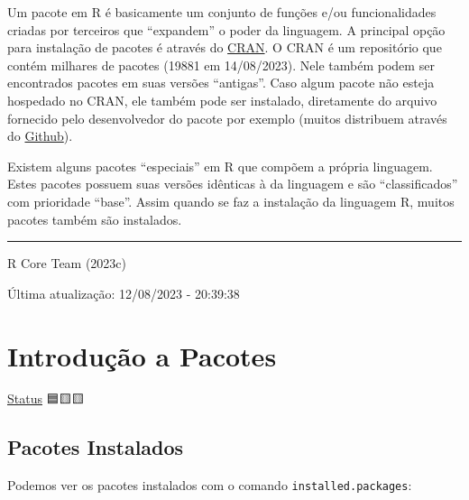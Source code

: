 \documentclass[
  letterpaper,
  DIV=11,
  numbers=noendperiod]{scrreprt}
\newenvironment{Shaded}{\begin{snugshade}}{\end{snugshade}}
\newcommand{\CommentTok}[1]{\textcolor[rgb]{0.37,0.37,0.37}{#1}}
\newcommand{\DecValTok}[1]{\textcolor[rgb]{0.68,0.00,0.00}{#1}}
\newcommand{\FunctionTok}[1]{\textcolor[rgb]{0.28,0.35,0.67}{#1}}
\newcommand{\NormalTok}[1]{\textcolor[rgb]{0.00,0.23,0.31}{#1}}
\newcommand{\SpecialCharTok}[1]{\textcolor[rgb]{0.37,0.37,0.37}{#1}}
\begin{document}
Um pacote em R é basicamente um conjunto de funções e/ou funcionalidades
criadas por terceiros que ``expandem'' o poder da linguagem. A principal
opção para instalação de pacotes é através do
\href{https://cran.r-project.org/web/packages/index.html}{CRAN}. O CRAN
é um repositório que contém milhares de pacotes (19881 em 14/08/2023).
Nele também podem ser encontrados pacotes em suas versões ``antigas''.
Caso algum pacote não esteja hospedado no CRAN, ele também pode ser
instalado, diretamente do arquivo fornecido pelo desenvolvedor do pacote
por exemplo (muitos distribuem através do
\href{https://github.com/}{Github}).

Existem alguns pacotes ``especiais'' em R que compõem a própria
linguagem. Estes pacotes possuem suas versões idênticas à da linguagem e
são ``classificados'' com prioridade ``base''. Assim quando se faz a
instalação da linguagem R, muitos pacotes também são instalados.

\begin{center}\rule{0.5\linewidth}{0.5pt}\end{center}

R Core Team (2023c)

Última atualização: 12/08/2023 - 20:39:38

\hypertarget{introduuxe7uxe3o-a-pacotes}{%
\chapter{Introdução a Pacotes}\label{introduuxe7uxe3o-a-pacotes}}

\protect\hyperlink{status-do-material}{Status} 🟦🟨🟨

\hypertarget{pacotes-instalados}{%
\section{Pacotes Instalados}\label{pacotes-instalados}}

Podemos ver os pacotes instalados com o comando
\texttt{installed.packages}:

\begin{Shaded}
\end{Shaded}
\end{document}
